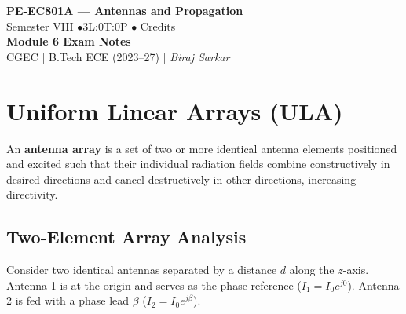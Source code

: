 \documentclass[12pt,a4paper]{article}
\begin{document}

\begin{center}
  {\LARGE\bfseries\color{myred} PE-EC801A --- Antennas and Propagation}\\[5pt]
  {\normalsize\color{mydark} Semester VIII \quad$\bullet$\quad 3L:0T:0P \quad$\bullet$ Credits}\\[3pt]
  {\normalsize\color{myteal}\textbf{Module 6 Exam Notes}}\\[3pt]
  {\small\color{mydark} CGEC \;$|$\; B.Tech ECE (2023--27) \;$|$\; \textit{Biraj Sarkar}}
\end{center}
\vspace{2pt}
\noindent{\color{myred}\rule{\linewidth}{1.5pt}}
\vspace{2pt}

\hypersetup{linkcolor=mydark}
\tableofcontents
\hypersetup{linkcolor=myteal}
\newpage

\section{Uniform Linear Arrays (ULA)}

\begin{tcolorbox}[defbox, title={\textbf{Definition of an Antenna Array}}]
An \textbf{antenna array} is a set of two or more identical antenna elements positioned and excited such that their individual radiation fields combine constructively in desired directions and cancel destructively in other directions, increasing directivity.
\end{tcolorbox}

\subsection{Two-Element Array Analysis}
Consider two identical antennas separated by a distance $d$ along the $z$-axis. Antenna 1 is at the origin and serves as the phase reference ($I_1 = I_0 e^{j0}$). Antenna 2 is fed with a phase lead $\beta$ ($I_2 = I_0 e^{j\beta}$).
\end{document}
